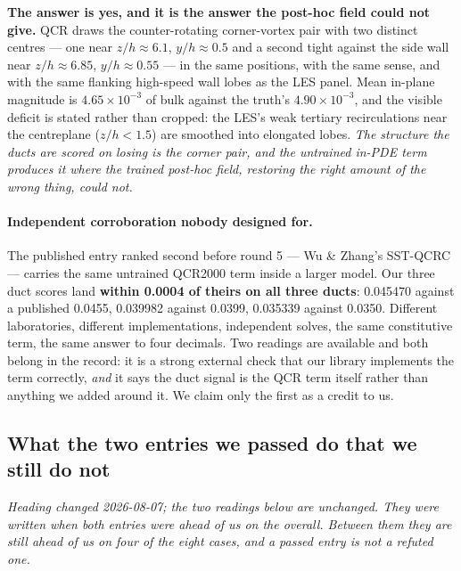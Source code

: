 \documentclass[11pt,a4paper]{article}
\begin{document}
\textbf{The answer is yes, and it is the answer the post-hoc field could not give.} QCR
draws the counter-rotating corner-vortex pair with two distinct centres --- one near
$z/h \approx 6.1$, $y/h \approx 0.5$ and a second tight against the side wall near
$z/h \approx 6.85$, $y/h \approx 0.55$ --- in the same positions, with the same sense, and
with the same flanking high-speed wall lobes as the LES panel. Mean in-plane magnitude is
$4.65\times10^{-3}$ of bulk against the truth's $4.90\times10^{-3}$, and the visible
deficit is stated rather than cropped: the LES's weak tertiary recirculations near the
centreplane ($z/h < 1.5$) are smoothed into elongated lobes. \emph{The structure the ducts
are scored on losing is the corner pair, and the untrained in-PDE term produces it where
the trained post-hoc field, restoring the right amount of the wrong thing, could not.}

\paragraph{Independent corroboration nobody designed for.} The published entry ranked
second before round 5 --- Wu \& Zhang's SST-QCRC --- carries the same untrained QCR2000
term inside a larger model. Our three duct scores land \textbf{within 0.0004 of theirs on
all three ducts}: 0.045470 against a published 0.0455, 0.039982 against 0.0399, 0.035339
against 0.0350. Different laboratories, different implementations, independent solves, the
same constitutive term, the same answer to four decimals. Two readings are available and
both belong in the record: it is a strong external check that our library implements the
term correctly, \emph{and} it says the duct signal is the QCR term itself rather than
anything we added around it. We claim only the first as a credit to us.

\subsection{What the two entries we passed do that we still do not}

\emph{Heading changed 2026-08-07; the two readings below are unchanged. They were written
when both entries were ahead of us on the overall. Between them they are still ahead of us
on four of the eight cases, and a passed entry is not a refuted one.}
\end{document}
